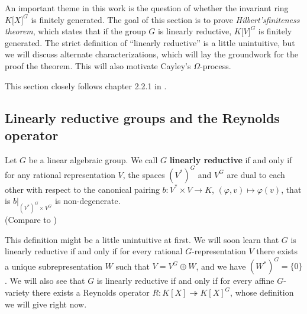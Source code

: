 An important theme in this work is the question of whether the invariant ring $ K\lbrack X\rbrack^G $ is finitely generated.
The goal of this section is to prove \textit{Hilbert's\linebreak finiteness theorem}, which states that if the group $G$ is linearly reductive, $ K\lbrack V\rbrack^G $ is finitely generated.
The strict definition of ``linearly reductive'' is a little unintuitive, but we will discuss alternate characterizations, which will lay the groundwork for the proof the theorem.
This will also motivate Cayley's $\Omega$-process.

This section closely follows chapter 2.2.1 in \cite{DK15}.

\subsection{Linearly reductive groups and the Reynolds operator}


\begin{definition}
  Let $G$ be a linear algebraic group.
  We call $G$ \textbf{linearly reductive} if and only if for any rational representation $V$, the spaces $(V^\ast)^G$ and $V^G$ are dual to each other with respect to the canonical pairing $b \colon V^\ast \times V \rightarrow K$, $(\varphi,v) \mapsto \varphi(v)$, that is $\left. b \right|_{(V^\ast)^G \times V^G}$ is non-degenerate.  \\
  (Compare to \cite[2.2.1, 2.2.5 (a)$\implies$(b)]{DK15})
\end{definition}

This definition might be a little unintuitive at first.
We will soon learn that $G$ is linearly reductive if and only if for every rational $G$-representation $V$ there exists a unique subrepresentation $W$ such that $V = V^G \oplus W$, and we have $(W^\ast)^G = \{0\}$.
We will also see that $G$ is linearly reductive if and only if for every affine $G$-variety there exists a Reynolds operator $R \colon K[X] \twoheadrightarrow K[X]^G$, whose definition we will give right now.


